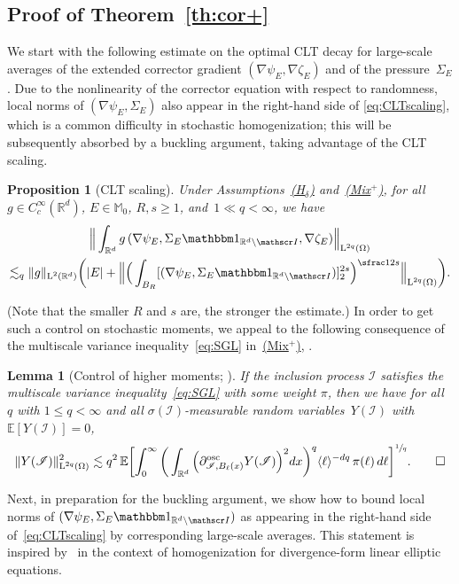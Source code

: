 \documentclass[JEP,XML,SOM,Unicode,published]{cedram}
\let\mathcal\mathscr
\newcommand{\Hd}{\hyperref[Hd]{\textup{(H$_\delta$)}}\xspace}
\newcommand{\Mix}{\hyperref[Mix+]{\textup{(Mix$^+$)}}\xspace}
\let\mathds\mathbbm
\theoremstyle{plain}
\newtheorem{lem}[theor]{Lemma}
\newtheorem{propo}[theor]{Proposition}
\theoremstyle{definition}
\newcommand{\R}{\mathbb R}
\newcommand{\Ic}{\mathcal I}
\newcommand{\Md}{\mathbb M}
\newcommand{\Ld}{\operatorname{L}}
\newcommand{\E}{\mathbb{E}}
\newcommand{\expec}[1]{\mathbb{E}\left[ #1 \right]}
\begin{document}
\subsection{Proof of Theorem~\ref{th:cor+}}\label{sec:fluc-str}
We start with the following estimate on the optimal CLT decay for large-scale averages of the extended corrector gradient $(\nabla\psi_E,\nabla\zeta_E)$ and of the pressure~$\Sigma_E$.
Due to the nonlinearity of the corrector equation with respect to randomness, local norms of $(\nabla\psi_E,\Sigma_E)$ also appear in the right-hand side of \eqref{eq:CLTscaling}, which is a common difficulty in stochastic homogenization; this will be subsequently absorbed by a buckling argument, taking advantage of the CLT scaling.
\begin{propo}[CLT scaling]\label{prop:CLTscaling}
Under Assumptions~\Hd and~\Mix, for all $g\in C^\infty_c(\R^d)$, $E\in\Md_0$, $R,s\ge1$, and~$1\ll q<\infty$, we have
\begin{multline}\label{eq:CLTscaling}
\Big\|\int_{\R^d}g\,(\nabla \psi_E,\Sigma_E\mathds1_{\R^d\setminus\Ic},\nabla\zeta_E)\Big\|_{\Ld^{2q}(\Omega)}\\
\lesssim_q \|g\|_{\Ld^2(\R^d)}\bigg(|E|+\Big\|\Big(\int_{B_{R}}[(\nabla\psi_E,\Sigma_E\mathds1_{\R^d\setminus\Ic})]_2^{2s}\Big)^{\sfrac1{2s}}\Big\|_{\Ld^{2q}(\Omega)}\bigg).
\end{multline}
\end{propo}
(Note that the smaller $R$ and $s$ are, the stronger the estimate.)
In order to get such a control on stochastic moments, we appeal to the following consequence of the multiscale variance inequality~\eqref{eq:SGL} in~\Mix, \cf \cite[Prop.\,1.10(ii)]{DG1}.

\begin{lem}[Control of higher moments; \cite{DG1}]\label{lem:p}
If the inclusion process $\Ic$ satisfies the multiscale variance inequality~\eqref{eq:SGL} with some weight $\pi$, then we have for all $q$ with $1\le q<\infty$ and all $\sigma(\Ic)$-measurable random variables~$Y(\Ic)$
with \hbox{$\expec{Y(\Ic)}=0$},
\begin{equation}\label{eq:SGL-p}
\|Y(\Ic)\|_{\Ld^{2q}(\Omega)}^2\lesssim q^2\,\E\bigg[{\int_0^\infty \bigg(\int_{\R^d}\Big(\partial^{\operatorname{osc}}_{\Ic,B_\ell(x)}Y(\Ic)\Big)^2dx\bigg)^q \langle\ell\rangle^{-dq}\,\pi(\ell)\,d\ell}\bigg]^{\sfrac1q}.
\qedhere
\end{equation}
\end{lem}

Next, in preparation for the buckling argument, we show how to bound local norms of $(\nabla\psi_E,\Sigma_E\mathds1_{\R^d\setminus\Ic})$ as appearing in the right-hand side of~\eqref{eq:CLTscaling} by corresponding large-scale averages.
This statement is inspired by~\cite{JO} in the context of homogenization for divergence-form linear elliptic equations.
\end{document}
